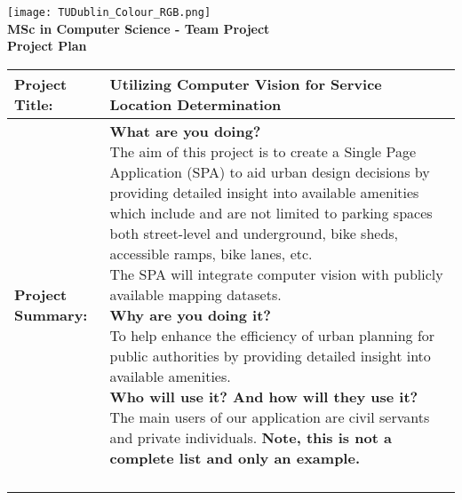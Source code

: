 \documentclass[a4paper,12pt]{article}
\begin{document}
\begin{center}
    \texttt{[image: TUDublin\_Colour\_RGB.png]}\\
    \vspace{0.3cm}
    {\Large \textbf{MSc in Computer Science - Team Project}}\\
    \vspace{0.2cm}
    {\large \textbf{Project Plan}}\\
    \vspace{1cm}
\end{center}

\begin{center}
    \begin{tabular}{|p{}|p{}|}
        \hline
        \textbf{Project Title:} & \parbox{0.65\textwidth}{\vspace{0.3cm}Utilizing Computer Vision for Service Location Determination\vspace{0.3cm}} \\ 
        \hline
        \textbf{Project Summary:} & \parbox{0.65\textwidth}{\vspace{0.3cm} \textbf{What are you doing?} \vspace{0.3cm}\\ The aim of this project is to create a Single Page Application (SPA) to aid urban design decisions by providing detailed insight into available amenities which include and are not limited to parking spaces both street-level and underground, bike sheds, accessible ramps, bike lanes, etc.\\ The SPA will integrate computer vision with publicly available mapping datasets.\\
        \vspace{0.3cm} \textbf{Why are you doing it?} \vspace{0.3cm}\\ To help enhance the efficiency of urban planning for public authorities by providing detailed insight into available amenities.\\
        \vspace{0.3cm} \textbf{Who will use it? And how will they use it?} \vspace{0.3cm}\\ The main users of our application are civil servants and private individuals. \textbf{Note, this is not a complete list and only an example.}\\ \\
}
\end{tabular}
\end{center}
\end{document}
